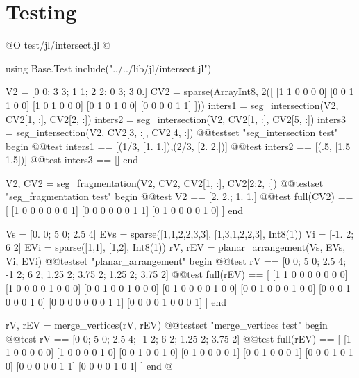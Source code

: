 \documentclass[10pt,oneside]{article}
\begin{document}
\section{Testing}
@O test/jl/intersect.jl
@{using Base.Test
include("../../lib/jl/intersect.jl")

V2 = [0 0; 3 3; 1 1; 2 2; 0 3; 3 0.]
CV2 = sparse(Array{Int8, 2}([
    [1 1 0 0 0 0]
    [0 0 1 1 0 0]
    [1 0 1 0 0 0]
    [0 1 0 1 0 0]
    [0 0 0 0 1 1]
]))
inters1 = seg_intersection(V2, CV2[1, :], CV2[2, :])
inters2 = seg_intersection(V2, CV2[1, :], CV2[5, :])
inters3 = seg_intersection(V2, CV2[3, :], CV2[4, :])
@@testset "seg_intersection test" begin
    @@test inters1 == [(1/3, [1. 1.]),(2/3, [2. 2.])]
    @@test inters2 == [(.5, [1.5 1.5])]
    @@test inters3 == []
end

V2, CV2 = seg_fragmentation(V2, CV2, CV2[1, :], CV2[2:2, :])
@@testset "seg_fragmentation test" begin
    @@test V2 == [2. 2.; 1. 1.]
    @@test full(CV2) == [
        [1 0 0 0 0 0 0 1]
        [0 0 0 0 0 0 1 1]
        [0 1 0 0 0 0 1 0]
    ] 
end

Vs = [0. 0; 5 0; 2.5 4]
EVs = sparse([1,1,2,2,3,3], [1,3,1,2,2,3], Int8(1))
Vi = [-1. 2; 6 2]
EVi = sparse([1,1], [1,2], Int8(1))
rV, rEV = planar_arrangement(Vs, EVs, Vi, EVi)
@@testset "planar_arrangement" begin
    @@test rV == [0 0; 5 0; 2.5 4; -1 2; 6 2; 1.25 2; 3.75 2; 1.25 2; 3.75 2]
    @@test full(rEV) == [
        [1 1 0 0 0 0 0 0 0]
        [1 0 0 0 0 1 0 0 0]
        [0 0 1 0 0 1 0 0 0]
        [0 1 0 0 0 0 1 0 0]
        [0 0 1 0 0 0 1 0 0]
        [0 0 0 1 0 0 0 1 0]
        [0 0 0 0 0 0 0 1 1]
        [0 0 0 0 1 0 0 0 1]
    ]
end


rV, rEV = merge_vertices(rV, rEV)
@@testset "merge_vertices test" begin
    @@test rV == [0 0; 5 0; 2.5 4; -1 2; 6 2; 1.25 2; 3.75 2]
    @@test full(rEV) == [
        [1 1 0 0 0 0 0]
        [1 0 0 0 0 1 0]
        [0 0 1 0 0 1 0]
        [0 1 0 0 0 0 1]
        [0 0 1 0 0 0 1]
        [0 0 0 1 0 1 0]
        [0 0 0 0 0 1 1]
        [0 0 0 0 1 0 1]
    ]
end
@}
\end{document}
